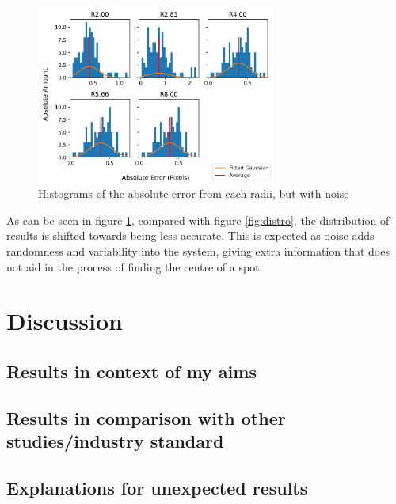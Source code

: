 \documentclass[aps,pra,a4paper,nofootinbib,onecolumn,tightenlines,longbibliography,12pt,amsfonts,amssymb,amsmath,floatfix]{revtex4-2} %
\begin{document}
  \begin{figure}[H]
    \begin{center}
      \includegraphics[width=0.7\textwidth]{project_pics/distro_noise.png}
    \end{center}
    \caption{Histograms of the absolute error from each radii, but with noise}
    \label{fig:distro_noise}
  \end{figure}

As can be seen in figure \ref{fig:distro_noise}, compared with figure \ref{fig:distro}, the distribution
of results is shifted towards being less accurate. This is expected as noise adds randomness and 
variability into the system, giving extra information that does not aid in the process of finding the 
centre of a spot. 
  
  
      

\section{Discussion} %
\label{sec:Discussion}


  \subsection{Results in context of my aims} %
  \label{sub:Results in context of my aims}

  \subsection{Results in comparison with other studies/industry standard} %
  \label{sub:Results in comparison with other studies/industry standard}
  
  \subsection{Explanations for unexpected results} %
  \label{sub:Explanations for unexpected results}
  
\end{document}
